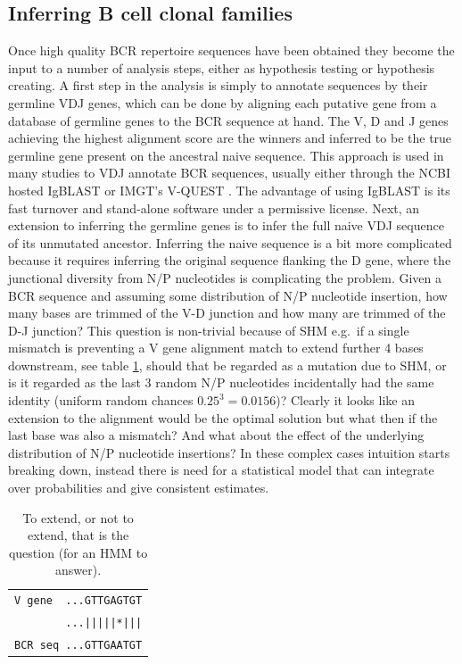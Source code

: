 \subsection{Inferring B cell clonal families}
Once high quality BCR repertoire sequences have been obtained they become the input to a number of analysis steps, either as hypothesis testing or hypothesis creating.
A first step in the analysis is simply to annotate sequences by their germline VDJ genes, which can be done by aligning each putative gene from a database of germline genes to the BCR sequence at hand.
The V, D and J genes achieving the highest alignment score are the winners and inferred to be the true germline gene present on the ancestral naive sequence.
This approach is used in many studies to VDJ annotate BCR sequences, usually either through the NCBI hosted IgBLAST \cite{ye2013igblast} or IMGT's V-QUEST \cite{li2013imgt}.
The advantage of using IgBLAST is its fast turnover and stand-alone software under a permissive license.
Next, an extension to inferring the germline genes is to infer the full naive VDJ sequence of its unmutated ancestor.
Inferring the naive sequence is a bit more complicated because it requires inferring the original sequence flanking the D gene, where the junctional diversity from N/P nucleotides is complicating the problem.
Given a BCR sequence and assuming some distribution of N/P nucleotide insertion, how many bases are trimmed of the V-D junction and how many are trimmed of the D-J junction?
This question is non-trivial because of SHM e.g.\ if a single mismatch is preventing a V gene alignment match to extend further 4 bases downstream, see table \ref{extend_or_not}, should that be regarded as a mutation due to SHM, or is it regarded as the last 3 random N/P nucleotides incidentally had the same identity (uniform random chances $0.25^3=0.0156$)?
Clearly it looks like an extension to the alignment would be the optimal solution but what then if the last base was also a mismatch?
And what about the effect of the underlying distribution of N/P nucleotide insertions?
In these complex cases intuition starts breaking down, instead there is need for a statistical model that can integrate over probabilities and give consistent estimates.
\begin{table}[ht]
\centering
\begin{tabular}{l}
\texttt{V gene \ ...GTTGAGTGT} \\
\texttt{\ \ \ \ \ \ \ \ ...|||||*|||} \\
\texttt{BCR seq ...GTTGAATGT}
\end{tabular}
\caption{To extend, or not to extend, that is the question (for an HMM to answer).}
\label{extend_or_not}
\end{table}

